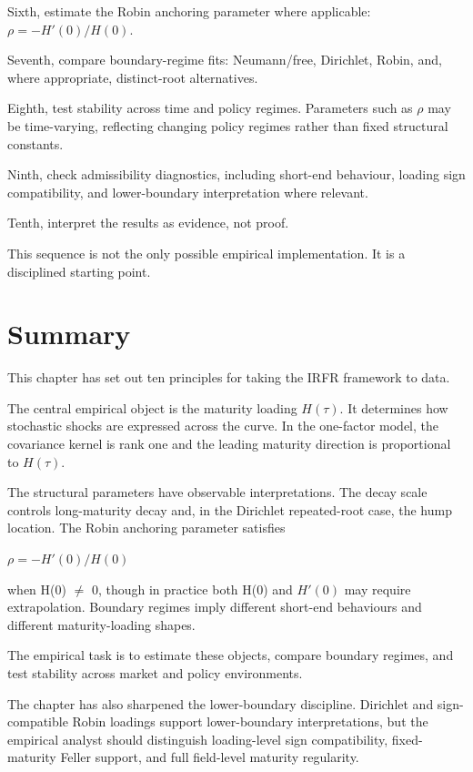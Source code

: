 \documentclass[11pt,oneside]{book}
\begin{document}
Sixth, estimate the Robin anchoring parameter where applicable:
$\rho=-H'(0)/H(0)$.

Seventh, compare boundary-regime fits: Neumann/free, Dirichlet, Robin,
and, where appropriate, distinct-root alternatives.

Eighth, test stability across time and policy regimes. Parameters such
as $\rho$ may be time-varying, reflecting changing policy regimes rather than
fixed structural constants.

Ninth, check admissibility diagnostics, including short-end behaviour,
loading sign compatibility, and lower-boundary interpretation where
relevant.

Tenth, interpret the results as evidence, not proof.

This sequence is not the only possible empirical implementation. It is a
disciplined starting point.

\section{Summary}\label{summary-7}

This chapter has set out ten principles for taking the IRFR framework to
data.

The central empirical object is the maturity loading $H(\tau)$. It determines
how stochastic shocks are expressed across the curve. In the one-factor
model, the covariance kernel is rank one and the leading maturity
direction is proportional to $H(\tau)$.

The structural parameters have observable interpretations. The decay
scale controls long-maturity decay and, in the Dirichlet repeated-root
case, the hump location. The Robin anchoring parameter satisfies

$\rho=-H'(0)/H(0)$

when H(0) $\neq$ 0, though in practice both H(0) and $H'(0)$ may require
extrapolation. Boundary regimes imply different short-end behaviours and
different maturity-loading shapes.

The empirical task is to estimate these objects, compare boundary
regimes, and test stability across market and policy environments.

The chapter has also sharpened the lower-boundary discipline. Dirichlet
and sign-compatible Robin loadings support lower-boundary
interpretations, but the empirical analyst should distinguish
loading-level sign compatibility, fixed-maturity Feller support, and
full field-level maturity regularity.
\end{document}
